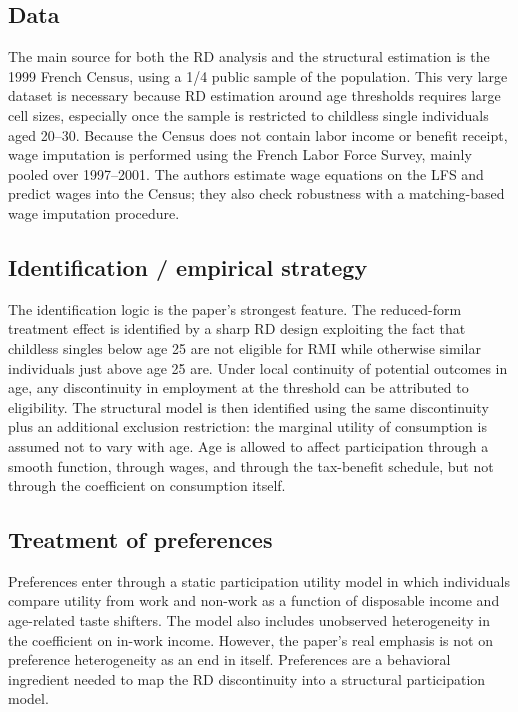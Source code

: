 \documentclass[11pt,a4paper]{article}
\begin{document}
\subsection*{Data}
The main source for both the RD analysis and the structural estimation is the 1999 French Census, using a 1/4 public sample of the population. This very large dataset is necessary because RD estimation around age thresholds requires large cell sizes, especially once the sample is restricted to childless single individuals aged 20–30. Because the Census does not contain labor income or benefit receipt, wage imputation is performed using the French Labor Force Survey, mainly pooled over 1997–2001. The authors estimate wage equations on the LFS and predict wages into the Census; they also check robustness with a matching-based wage imputation procedure.

\subsection*{Identification / empirical strategy}
The identification logic is the paper’s strongest feature. The reduced-form treatment effect is identified by a sharp RD design exploiting the fact that childless singles below age 25 are not eligible for RMI while otherwise similar individuals just above age 25 are. Under local continuity of potential outcomes in age, any discontinuity in employment at the threshold can be attributed to eligibility. The structural model is then identified using the same discontinuity plus an additional exclusion restriction: the marginal utility of consumption is assumed not to vary with age. Age is allowed to affect participation through a smooth function, through wages, and through the tax-benefit schedule, but not through the coefficient on consumption itself.

\subsection*{Treatment of preferences}
Preferences enter through a static participation utility model in which individuals compare utility from work and non-work as a function of disposable income and age-related taste shifters. The model also includes unobserved heterogeneity in the coefficient on in-work income. However, the paper’s real emphasis is not on preference heterogeneity as an end in itself. Preferences are a behavioral ingredient needed to map the RD discontinuity into a structural participation model.
\end{document}
